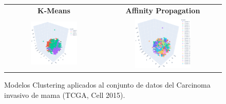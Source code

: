\begin{figure} 
	\setlength\tabcolsep{3pt}%
	\centering
	\caption{Modelos Clustering aplicados al conjunto de datos del Carcinoma invasivo de mama (TCGA, Cell 2015). }
	\label{TSNE}
	\begin{tabular}{|c|c|}
		\hline
		\textbf{K-Means} &
		\textbf{Affinity Propagation} \\
		\includegraphics[width=0.5\textwidth]{NOTEBOOK/IMAGENES_CLUSTERING/1_TNSE_Kmeans} &
		\includegraphics[width=0.5\textwidth]{NOTEBOOK/IMAGENES_CLUSTERING/2_TNSE_Affinity_Propagation} \\
		\hline
		

\end{tabular}
\end{figure}
